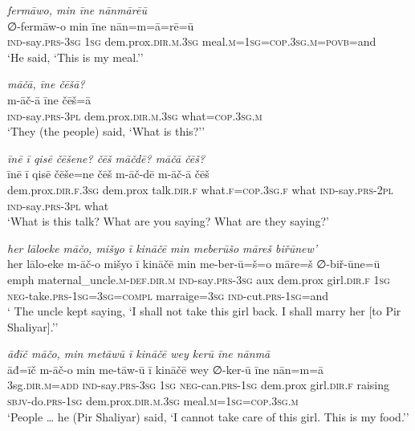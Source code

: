 \ea \label{ŽP.217}
\textit{fermāwo, min īne nānmārēū} \\ 
\gll ∅-fermāw-o min īne nān=m=ā=rē=ū \\ 
 \textsc{ind-}say\textsc{.prs}\textsc{-3sg} \textsc{1sg} dem.prox\textsc{.dir}\textsc{.m}\textsc{.3sg} meal\textsc{.m}\textsc{=\textsc{1sg}}\textsc{=cop}\textsc{.3sg}\textsc{.m}\textsc{=\textsc{povb}}=and \\ 
\glt `He said, ‘This is my meal.’'
\z 
 
\ea \label{ŽP.222}
\textit{māčā, īne čēšā?} \\ 
\gll m-āč-ā īne čēš=ā \\ 
 \textsc{ind-}say\textsc{.prs}\textsc{-3pl} dem.prox\textsc{.dir}\textsc{.m}\textsc{.3sg} what\textsc{=cop}\textsc{.3sg}\textsc{.m} \\ 
\glt `They (the people) said, ‘What is this?’'
\z 
 
\ea \label{ŽP.223}
\textit{īnē ī qisē čēšene? čēš māčdē? māčā čēš?} \\ 
\gll īnē ī qisē čēše=ne čēš m-āč-dē m-āč-ā čēš \\ 
 dem.prox\textsc{.dir}\textsc{.f}\textsc{.3sg} dem.prox talk\textsc{.dir}\textsc{.f} what\textsc{.f}\textsc{=cop}\textsc{.3sg}\textsc{.f} what \textsc{ind-}say\textsc{.prs}-\textsc{2pl} \textsc{ind-}say\textsc{.prs}\textsc{-3pl} what \\ 
\glt `What is this talk? What are you saying? What are they saying?'
\z 
 
\ea \label{ŽP.225}
\textit{her lāloeke māčo, mišyo ī kināčē min meberūšo māreš biřūnew’} \\ 
\gll her lālo-eke m-āč-o mišyo ī kināčē min me-ber-ū=š=o māre=š ∅-biř-ūne=ū \\ 
 emph maternal\_uncle\textsc{.m}\textsc{-def}\textsc{.dir}\textsc{.m} \textsc{ind-}say\textsc{.prs}\textsc{-3sg} aux dem.prox girl\textsc{.dir}\textsc{.f} \textsc{1sg} \textsc{neg-}take\textsc{.prs}\textsc{-\textsc{1sg}}\textsc{=3sg}\textsc{=compl} marraige\textsc{=3sg} \textsc{ind-}cut\textsc{.prs}\textsc{-\textsc{1sg}}=and \\ 
\glt ` The uncle kept saying, ‘I shall not take this girl back. I shall marry her [to Pir Shaliyar].’'
\z 
 
\ea \label{ŽP.226}
\textit{āđīč māčo, min metāwū ī kināčē wey kerū īne nānmā} \\ 
\gll āđ=īč m-āč-o min me-tāw-ū ī kināčē wey ∅-ker-ū īne nān=m=ā \\ 
 3sg\textsc{.dir}\textsc{.m}\textsc{=add} \textsc{ind-}say\textsc{.prs}\textsc{-3sg} \textsc{1sg} \textsc{neg-}can\textsc{.prs}\textsc{-\textsc{1sg}} dem.prox girl\textsc{.dir}\textsc{.f} raising \textsc{sbjv-}do\textsc{.prs}\textsc{-\textsc{1sg}} dem.prox\textsc{.dir}\textsc{.m}\textsc{.3sg} meal\textsc{.m}\textsc{=\textsc{1sg}}\textsc{=cop}\textsc{.3sg}\textsc{.m} \\ 
\glt `People … he (Pir Shaliyar) said, ‘I cannot take care of this girl. This is my food.’'
\z 
 
